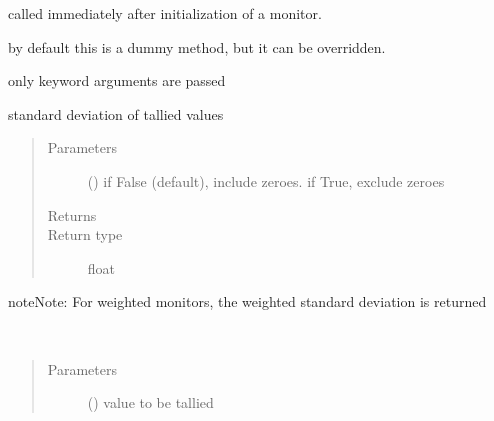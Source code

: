 \documentclass[letterpaper,10pt,english]{sphinxmanual}
\begin{document}
\begin{fulllineitems}

\begin{fulllineitems}
\label{\detokenize{Reference:salabim.Monitor.setup}}
called immediately after initialization of a monitor.

by default this is a dummy method, but it can be overridden.

only keyword arguments are passed

\end{fulllineitems}


\begin{fulllineitems}
\label{\detokenize{Reference:salabim.Monitor.std}}
standard deviation of tallied values
\begin{quote}\begin{description}
\item[{Parameters}] \leavevmode
{} () \textendash{} if False (default), include zeroes. if True, exclude zeroes

\item[{Returns}] \leavevmode
{}

\item[{Return type}] \leavevmode
float

\end{description}\end{quote}

\begin{sphinxadmonition}{note}{Note:}
For weighted monitors, the weighted standard deviation is returned
\end{sphinxadmonition}

\end{fulllineitems}


\begin{fulllineitems}
\label{\detokenize{Reference:salabim.Monitor.tally}}~\begin{quote}\begin{description}
\item[{Parameters}] \leavevmode
{} (\sphinxstyleliteralemphasis{, }\sphinxstyleliteralemphasis{, }) \textendash{} value to be tallied


\end{description}
\end{quote}
\end{fulllineitems}
\end{fulllineitems}
\end{document}
